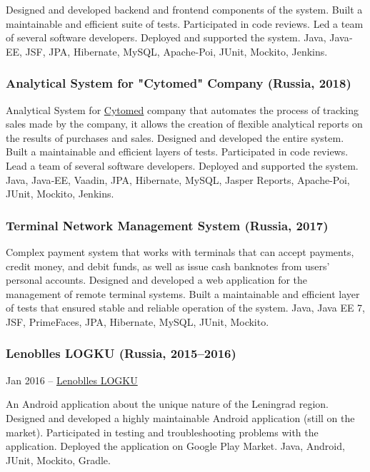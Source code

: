 \documentclass{vl}
\begin{document}
    Designed and developed backend and frontend components of the system.
    Built a maintainable and efficient suite of tests.
    Participated in code reviews.
    Led a team of several software developers.
    Deployed and supported the system.
    Java, Java‐EE, JSF, JPA, Hibernate, MySQL, Apache-Poi, JUnit, Mockito, Jenkins.

    \subsubsection*{Analytical System for "Cytomed" Company (Russia, 2018)}
    Analytical System for \href{https://cytomed.ru/en/}{Cytomed} company that automates the process of tracking sales
    made by the company, it allows the creation of flexible analytical reports on the results of purchases and sales.
    Designed and developed the entire system.
    Built a maintainable and efficient layers of tests.
    Participated in code reviews.
    Lead a team of several software developers.
    Deployed and supported the system.
    Java, Java‐EE, Vaadin, JPA, Hibernate, MySQL, Jasper Reports, Apache-Poi, JUnit, Mockito, Jenkins.

    \subsubsection*{Terminal Network Management System (Russia, 2017)}

    Complex payment system that works with terminals that can accept payments, credit money, and debit funds,
    as well as issue cash banknotes from users' personal accounts.
    Designed and developed a web application for the management of remote terminal systems.
    Built a maintainable and efficient layer of tests that ensured stable and reliable operation of the system.
    Java, Java EE 7, JSF, PrimeFaces, JPA, Hibernate, MySQL, JUnit, Mockito.

    \subsubsection*{Lenoblles LOGKU (Russia, 2015--2016)}
    Jan 2016 – \href{https://play.google.com/store/apps/details?id=com.altinntech.oopt_lo}{Lenoblles LOGKU}

    An Android application about the unique nature of the Leningrad region.
    Designed and developed a highly maintainable Android application (still on the market).
    Participated in testing and troubleshooting problems with the application.
    Deployed the application on Google Play Market.
    Java, Android, JUnit, Mockito, Gradle.
\end{document}
